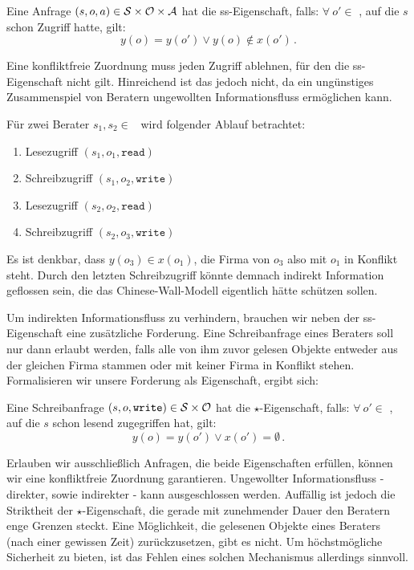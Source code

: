 \begin{definition}\indexCWSimpleSecurity
  Eine Anfrage $(s, o, a) \in \mathcal{S} \times \mathcal{O} \times \mathcal{A}$ hat die
  ss-Eigenschaft, falls: \(\forall\ o' \in\) \calO, auf die \(s\) schon
  Zugriff hatte, gilt:
  \[
    y(o) = y(o') \lor y(o) \notin x(o')\, .
  \]
\end{definition}

Eine konfliktfreie Zuordnung muss jeden Zugriff ablehnen, für den die
ss-Eigenschaft nicht gilt. Hinreichend ist das jedoch nicht, da ein
ungünstiges Zusammenspiel von Beratern ungewollten Informationsfluss
ermöglichen kann. 

\begin{beispiel}
  Für zwei Berater \(s_1, s_2 \in\) \calS\ wird folgender Ablauf betrachtet:
  \begin{multicols}{2}
    \begin{enumerate}
    \item Lesezugriff \((s_1, o_1, \texttt{read})\)
    \item Schreibzugriff \((s_1, o_2, \texttt{write})\)
    \item Lesezugriff \((s_2, o_2, \texttt{read})\)
    \item Schreibzugriff \((s_2, o_3, \texttt{write})\)
    \end{enumerate}
  \end{multicols}
  Es ist denkbar, dass \(y(o_3) \in x(o_1)\), die Firma von \(o_3\) also
  mit \(o_1\) in Konflikt steht. Durch den letzten Schreibzugriff könnte
  demnach indirekt Information geflossen sein, die das
  Chinese-Wall-Modell eigentlich hätte schützen sollen.  
\end{beispiel}

Um indirekten Informationsfluss zu verhindern, brauchen wir neben der
ss-Eigenschaft eine zusätzliche Forderung. Eine Schreibanfrage eines
Beraters soll nur dann erlaubt werden, falls alle von ihm zuvor gelesen
Objekte entweder aus der gleichen Firma stammen oder mit keiner Firma in
Konflikt stehen. Formalisieren wir unsere Forderung als Eigenschaft,
ergibt sich:

\begin{definition}\indexCWStarProperty
  Eine Schreibanfrage $(s, o, \texttt{write}) \in \mathcal{S} \times \mathcal{O}$
  hat die \(\star\)-Eigenschaft, falls: \(\forall\ o' \in\) \calO, auf
  die \(s\) schon lesend zugegriffen hat, gilt: 
  \[
    y(o) = y(o') \lor x(o') = \emptyset\, .
  \]
\end{definition}

Erlauben wir ausschließlich Anfragen, die beide Eigenschaften erfüllen,
können wir eine konfliktfreie Zuordnung garantieren. Ungewollter
Informationsfluss - direkter, sowie indirekter - kann ausgeschlossen
werden. Auffällig ist jedoch die Striktheit der \(\star\)-Eigenschaft,
die gerade mit zunehmender Dauer den Beratern enge Grenzen steckt. Eine
Möglichkeit, die gelesenen Objekte eines Beraters (nach einer gewissen
Zeit) zurückzusetzen, gibt es nicht. Um höchstmögliche Sicherheit zu
bieten, ist das Fehlen eines solchen Mechanismus allerdings sinnvoll.
